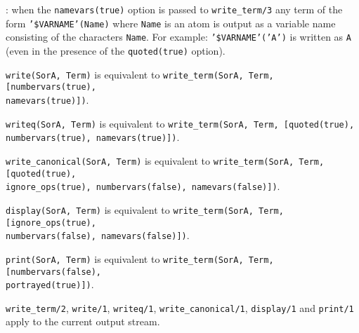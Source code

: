 : when the \texttt{namevars(true)} option is passed
to \texttt{write\_term/3} any term of the form \texttt{'\$VARNAME'(Name)}
where \texttt{Name} is an atom is output as a variable name consisting of
the characters \texttt{Name}. For example: \texttt{'\$VARNAME'('A')} is
written as \texttt{A} (even in the presence of the \texttt{quoted(true)}
option).

\texttt{write(SorA, Term)} is equivalent to
\texttt{write\_term(SorA, Term, [numbervars(true), \\
namevars(true)])}.

\texttt{writeq(SorA, Term)} is equivalent to
\texttt{write\_term(SorA, Term, [quoted(true), \\
numbervars(true), namevars(true)])}.

\texttt{write\_canonical(SorA, Term)} is equivalent to
\texttt{write\_term(SorA, Term, [quoted(true), \\
ignore\_ops(true), numbervars(false), namevars(false)])}.

\texttt{display(SorA, Term)} is equivalent to
\texttt{write\_term(SorA, Term, [ignore\_ops(true), \\
  numbervars(false), namevars(false)])}.

\texttt{print(SorA, Term)} is equivalent to
\texttt{write\_term(SorA, Term, [numbervars(false), \\
portrayed(true)])}.

\texttt{write\_term/2}, \texttt{write/1}, \texttt{writeq/1},
\texttt{write\_canonical/1}, \texttt{display/1} and \texttt{print/1} apply
to the current output stream.

\begin{PlErrors}









\end{PlErrors}


